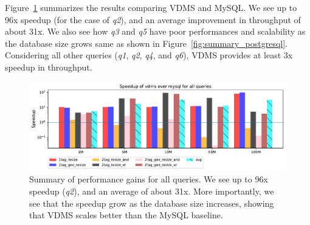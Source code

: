 Figure~\ref{fig:summary_mysql} summarizes the results
comparing VDMS and MySQL. We see up to 96x speedup (for the case of \textit{q2}),
and an average improvement in throughput of about 31x.
We also see how \textit{q3} and \textit{q5} have poor performances and scalability
as the database size grows same as shown in Figure~\ref{fig:summary_postgresql}.
Considering all other queries (\textit{q1}, \textit{q2}, \textit{q4}, and \textit{q6}), 
VDMS provides at least 3x speedup in throughput.

\begin{figure}[ht]
\includegraphics[width=\textwidth]{figures/plot_th_56_query_times_speedup_mysql}
\caption{Summary of performance gains for all queries.
We see up to 96x speedup (\textit{q2}), and an average of about 31x.
More importantly, we see that the speedup grow as the database size increases,
showing that VDMS scales better than the MySQL baseline.}
\label{fig:summary_mysql}
\end{figure}
